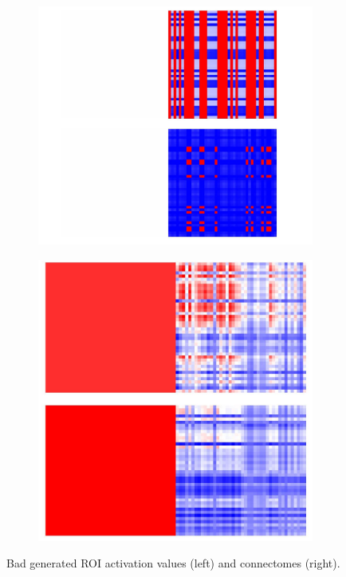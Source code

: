 		
	\begin{figure}[!h]
		\centering
		\begin{subfigure}[b]{0.45\textwidth}
			\centering
			\includegraphics[width=\textwidth]{figures/bad.png}
		\end{subfigure}
		\hfill
		\begin{subfigure}[b]{0.45\textwidth}
			\centering
			\includegraphics[width=\textwidth]{figures/bad2.png}
		\end{subfigure}
		\caption{Bad generated ROI activation values (left) and connectomes (right).}
		\label{fig:bad-samples}
	\end{figure}
	
